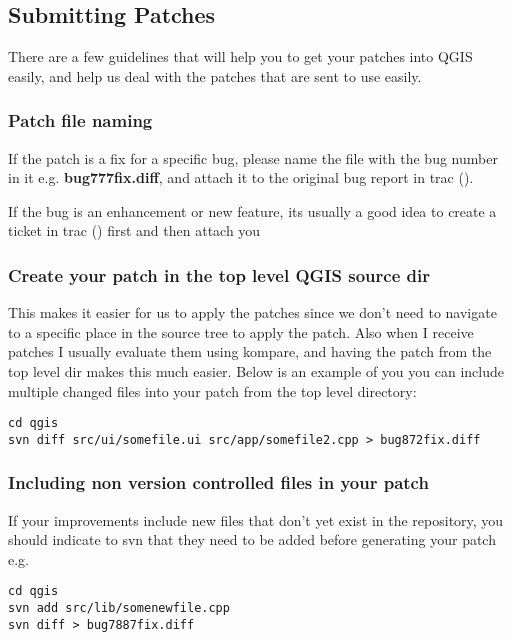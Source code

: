 \subsection{Submitting Patches}
There are a few guidelines that will help you to get your patches into QGIS easily, and help us 
deal with the patches that are sent to use easily.

\subsubsection{Patch file naming}
If the patch is a fix for a specific bug, please name the file with the bug number in it e.g. 
\textbf{bug777fix.diff}, and attach it to the original bug report in trac ().

If the bug is an enhancement or new feature, its usually a good idea to create a ticket in 
trac () first and then attach you 

\subsubsection{Create your patch in the top level QGIS source dir}
This makes it easier for us to apply the patches since we don't need to navigate to a specific 
place in the source tree to apply the patch. Also when I receive patches I usually evaluate them 
using kompare, and having the patch from the top level dir makes this much easier. Below is an 
example of you you can include multiple changed files into your patch from the top level directory:

\begin{verbatim}
cd qgis
svn diff src/ui/somefile.ui src/app/somefile2.cpp > bug872fix.diff
\end{verbatim}

\subsubsection{Including non version controlled files in your patch}
If your improvements include new files that don't yet exist in the repository, you should indicate 
to svn that they need to be added before generating your patch e.g.

\begin{verbatim}
cd qgis
svn add src/lib/somenewfile.cpp
svn diff > bug7887fix.diff
\end{verbatim}


